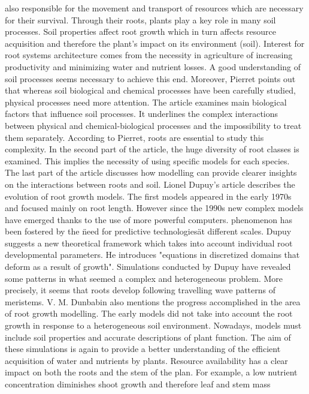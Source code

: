 also responsible for the movement and transport of resources which are necessary for
their survival. Through their roots, plants play a key role in many soil processes. Soil
properties affect root growth which in turn affects resource acquisition and therefore the
plant’s impact on its environment (soil). Interest for root systems architecture comes
from the necessity in agriculture of increasing productivity and minimizing water and
nutrient losses. A good understanding of soil processes seems necessary to achieve this
end. Moreover, Pierret points out that whereas soil biological and chemical processes
have been carefully studied, physical processes need more attention. The article examines
main biological factors that influence soil processes. It underlines the complex interactions
between physical and chemical-biological processes and the impossibility to treat them
separately. According to Pierret, roots are essential to study this complexity. In the
second part of the article, the huge diversity of root classes is examined. This implies the
necessity of using specific models for each species. The last part of the article discusses
how modelling can provide clearer insights on the interactions between roots and soil.
\bigbreak
Lionel Dupuy’s article describes the evolution of root growth models. The first models
appeared in the early 1970s and focused mainly on root length. However since the 1990s
new complex models have emerged thanks to the use of more powerful computers.
phenomenon has been fostered by the \"need for predictive technologies\" at different scales.
Dupuy suggests a new theoretical framework which takes into account individual root
developmental parameters. He introduces "equations in discretized domains that deform
as a result of growth". Simulations conducted by Dupuy have revealed some patterns in
what seemed a complex and heterogeneous problem. More precisely, it seems that roots
develop following travelling wave patterns of meristems.
\bigbreak
V. M. Dunbabin also mentions the progress accomplished in the area of root growth
modelling. The early models did not take into account the root growth in response to
a heterogeneous soil environment. Nowadays, models must include soil properties and
accurate descriptions of plant function. The aim of these simulations is again to provide a better understanding of the efficient acquisition of water and nutrients by plants. Resource
availability has a clear impact on both the roots and the stem of the plan. For example,
a low nutrient concentration diminishes shoot growth and therefore leaf and stem mass

